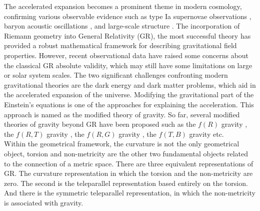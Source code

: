 The accelerated expansion becomes a prominent theme in modern cosmology, confirming various observable evidence such as type Ia supernovae observations \cite{Riess/1998,Perlmutter/1999,Spergel/2007}, baryon acoustic oscillations \cite{Eisenstein/2005,Cole/2005}, and large-scale structure \cite{Hawkins/2003}. The incorporation of Riemann geometry into General Relativity (GR), the most successful theory has provided a robust mathematical framework for describing gravitational field properties. However, recent observational data have raised some concerns about the classical GR absolute validity, which may still have some limitations on large or solar system scales. The two significant challenges confronting modern gravitational theories are the dark energy and dark matter problems, which aid in the accelerated expansion of the universe. Modifying the gravitational part of the Einstein's equations is one of the approaches for explaining the acceleration. This approach is named as the modified theory of gravity. So far, several modified theories of gravity beyond GR have been proposed such as the $f(R)$ gravity \cite{Buchdahl/1970,Capozziello/2011,Nojiri/2003}, the $f(R,T)$ gravity \cite{Arora/2020,Harko/2011,Moraes/2017,Yousaf/2018}, the $f(R, G)$ gravity \cite{Atazadeh/2014,Laurentis/2015}, the $f(T,B)$ gravity \cite{Bahamonde/2018,Capo/2020} etc.\\
Within the geometrical framework, the curvature is not the only geometrical object, torsion and non-metricity are the other two fundamental objects related to the connection of a metric space. There are three equivalent representations of GR. The curvature representation in which the torsion and the non-metricity are zero. The second is the teleparallel representation based entirely on the torsion. And there is the symmetric teleparallel representation, in which the non-metricity is associated with gravity.
